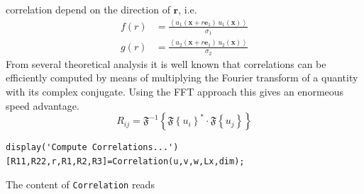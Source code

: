 \documentclass[preprint,12pt,ntfdMod]{elsarticle}
\begin{document}
\begin{par}
correlation depend on the direction of $\mathbf{r}$, i.e.
  \begin{eqnarray}
      f(r) &= \displaystyle\frac{\left<u_1(\mathbf{x}+r\mathbf{e}_1)\,u_1(\mathbf{x})\right>}
                  {\sigma_1}\\
      g(r) &= \displaystyle\frac{\left<u_2(\mathbf{x}+r\mathbf{e}_1)\,u_2(\mathbf{x})\right>}
                  {\sigma_2}
  \end{eqnarray}
From several theoretical analysis it is well known that correlations can
be efficiently computed by means of multiplying the Fourier transform of
a quantity with its complex conjugate. Using the FFT approach this gives
an enormeous speed advantage.
  \begin{equation}
      R_{ij} =
      \mathfrak{F}^{-1}\left\{\mathfrak{F}\left\{u_i\right\}^*\cdot\mathfrak{F}\left\{u_j\right\}\right\}
  \end{equation}

\end{par} \vspace{1em}
\begin{verbatim}
display('Compute Correlations...')
[R11,R22,r,R1,R2,R3]=Correlation(u,v,w,Lx,dim);
\end{verbatim}
\begin{par}

The content of \verb|Correlation| reads


\end{par} \vspace{1em}
\begin{par}




\end{par} \vspace{1em}
\end{document}
